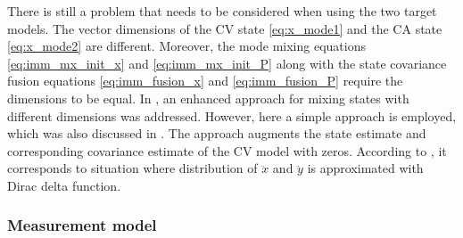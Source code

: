 \documentclass[english, 12pt, a4paper, elec, utf8, a-1b, online]{aaltothesis}
\begin{document}
There is still a problem that needs to be considered when using the two target models.
The vector dimensions of the CV state \eqref{eq:x_mode1} and the CA state \eqref{eq:x_mode2} are different. 
Moreover, the mode mixing equations \eqref{eq:imm_mx_init_x} and \eqref{eq:imm_mx_init_P} along with the state covariance fusion equations \eqref{eq:imm_fusion_x} and \eqref{eq:imm_fusion_P} require the dimensions to be equal.
In \cite{Granstroem2015}, an enhanced approach for mixing states with different dimensions was addressed.
However, here a simple approach is employed, which was also discussed in \cite{Granstroem2015}.
The approach augments the state estimate and corresponding covariance estimate of the CV model with zeros.
According to \cite{Granstroem2015}, it corresponds to situation where distribution of $\ddot{x}$ and $\ddot{y}$
is approximated with Dirac delta function.
 

\subsubsection{Measurement model}
\end{document}
